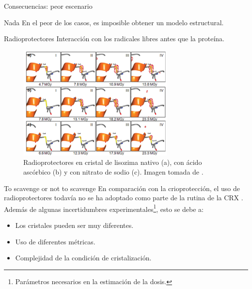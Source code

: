 \documentclass{beamer}
\begin{document}
\begin{frame}{Consecuencias: peor escenario}
	\begin{alertblock}{Nada}
		En el peor de los casos, es imposible obtener un modelo estructural.
	\end{alertblock}
\end{frame}
\begin{frame}{Radioprotectores}
Interacción con los radicales libres antes que la proteína.
\begin{figure}[h]
	\centering
	\includegraphics[width=0.7\textwidth]{delamora2011.png}
	\caption{Radioprotectores en cristal de lisozima nativo (a), con ácido ascórbico (b) y con nitrato de sodio (c). Imagen tomada de \cite{DeLaMora2011}.}
	\label{fig:delamora2011}
\end{figure}
\end{frame}
\begin{frame}{To scavenge or not to scavenge}
En comparación con la crioprotección, el uso de radioprotectores todavía no se ha adoptado como parte de la rutina de la CRX \cite{Nowak2009,Allan2013}. Además de algunas incertidumbres experimentales\footnote{Parámetros necesarios en la estimación de la dosis.}, esto se debe a:
\begin{itemize}
  \item Los cristales pueden ser muy diferentes.
  \item Uso de diferentes métricas.
  \item Complejidad de la condición de cristalización.
\end{itemize}
\end{frame}
\end{document}
